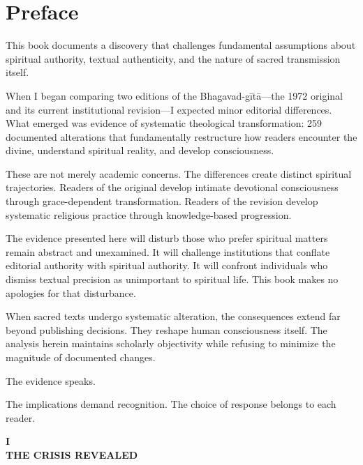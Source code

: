 \documentclass[11pt,twoside]{book}
\makeatletter
\newcommand{\startmainmatter}{\clearpage\pagenumbering{arabic}\setcounter{page}{1}}
\def\cleardoublepage{\clearpage\if@twoside \ifodd\c@page\else\hbox{}\thispagestyle{empty}\newpage\if@twocolumn\hbox{}\newpage\fi\fi\fi}
\makeatother
\begin{document}
\startmainmatter
\chapter*{Preface}
\label{sec:org0db0c67}

This book documents a discovery that challenges fundamental assumptions about spiritual authority, textual authenticity, and the nature of sacred transmission itself.

When I began comparing two editions of the Bhagavad-gītā—the 1972 original and its current institutional revision—I expected minor editorial differences. What emerged was evidence of systematic theological transformation: 259 documented alterations that fundamentally restructure how readers encounter the divine, understand spiritual reality, and develop consciousness.

These are not merely academic concerns. The differences create distinct spiritual trajectories. Readers of the original develop intimate devotional consciousness through grace-dependent transformation. Readers of the revision develop systematic religious practice through knowledge-based progression.

The evidence presented here will disturb those who prefer spiritual matters remain abstract and unexamined. It will challenge institutions that conflate editorial authority with spiritual authority. It will confront individuals who dismiss textual precision as unimportant to spiritual life. This book makes no apologies for that disturbance.

When sacred texts undergo systematic alteration, the consequences extend far beyond publishing decisions. They reshape human consciousness itself. The analysis herein maintains scholarly objectivity while refusing to minimize the magnitude of documented changes.

The evidence speaks.

The implications demand recognition. The choice of response belongs to each reader.

\newpage
\thispagestyle{empty}
\mbox{}

\cleardoublepage
\thispagestyle{empty}
\vspace*{0.25\textheight}
\begin{center}
{\Huge\bfseries\MakeUppercase{\textbf{I}}}\\[0.5cm]
{\huge\bfseries THE CRISIS REVEALED}
\end{center}
\vspace*{\fill}
\clearpage
\thispagestyle{empty} %
\mbox{}
\newpage
\end{document}

